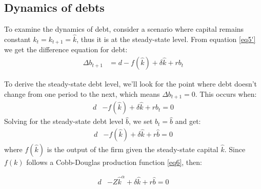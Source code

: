 \documentclass[12pt]{report}
\begin{document}
\subsection{Dynamics of debts}
To examine the dynamics of debt, consider a scenario where capital remains constant \(k_t=k_{t+1}=\widehat{k}\), thus it is at the
steady-state level. From equation \ref{eq5'} we get the difference equation for debt:
\begin{align}
    \Delta{b_{t+1}} &= d - f(\widehat{k}) + \delta \widehat{k} + r  b_{t}  \label{eq10}
\end{align}

To derive the steady-state debt level, we'll look for the point where debt doesn't change from one period to the next,
which means  \(\Delta{b_{t+1}} = 0\). This occurs when:
\begin{align}
    d &- f(\widehat{k}) + \delta \widehat{k} + r b_{t} = 0 
\end{align}
Solving for the steady-state debt level \( \widehat{b} \), we set \( b_{t} = \widehat{b} \) and get:
\begin{align}
    d &- f(\widehat{k}) + \delta \widehat{k} + r \widehat{b} = 0 
\end{align}
 where \( f(\widehat{k}) \) is the output of the firm given the
steady-state  capital \( \widehat{k} \). Since \( f(k) \) follows a Cobb-Douglas production function \ref{eq6},  then:

\begin{align}
    d &- Z \widehat{k}^\alpha + \delta \widehat{k} + r \widehat{b} = 0
\end{align}
\end{document}
